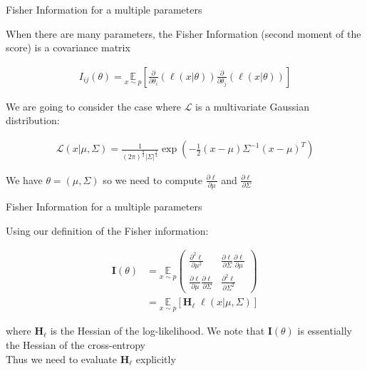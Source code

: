 \documentclass[aspectratio=1610]{beamer}					%
\begin{document}
\begin{frame}{Fisher Information for a multiple parameters}

When there are many parameters, the Fisher Information (second moment of the score) is a covariance matrix

\begin{align*}
I_{ij}(\theta) = \underset{{x\sim p}}{\mathbb{E}}\left[\frac{\partial}{\partial\theta_{i}} \left(\ell(x|\theta)\right)\frac{\partial}{\partial\theta_{j}} \left(\ell(x|\theta)\right)\right]
\end{align*}

We are going to consider the case where $\mathcal{L}$ is a multivariate Gaussian distribution:

\begin{align*}
\mathcal{L}(x|\mu,\Sigma) = \frac{1}{(2\pi)^{\frac{d}{2}}|\Sigma|^{\frac{1}{2}}}\exp\left(-\frac{1}{2}(x-\mu)\Sigma^{-1}(x-\mu)^{T}\right)
\end{align*}

We have $\theta=(\mu,\Sigma)$ so we need to compute $\frac{\partial \ell}{\partial \mu}$ and $\frac{\partial \ell}{\partial \Sigma}$


\end{frame}

\begin{frame}{Fisher Information for a multiple parameters}

Using our definition of the Fisher information:

\begin{align*}
\mathbf{I}(\theta) &= \underset{{x\sim p}}{\mathbb{E}}\begin{pmatrix}
\frac{\partial^{2}\ell}{\partial\mu^{2}} & \frac{\partial\ell}{\partial\Sigma}\frac{\partial\ell}{\partial\mu}\\
\frac{\partial\ell}{\partial\mu}\frac{\partial\ell}{\partial\Sigma} & \frac{\partial^{2}\ell}{\partial\Sigma^{2}}
\end{pmatrix}\\
&= \underset{{x\sim p}}{\mathbb{E}}\left[\mathbf{H}_{\ell}\;\ell(x|\mu,\Sigma)\right]
\end{align*}

where $\mathbf{H}_{\ell}$ is the Hessian of the log-likelihood. We note that $\mathbf{I}(\theta)$ is essentially the Hessian of the cross-entropy\\
\vspace{0.1in}
Thus we need to evaluate $\mathbf{H}_{\ell}$ explicitly


\end{frame}
\end{document}
